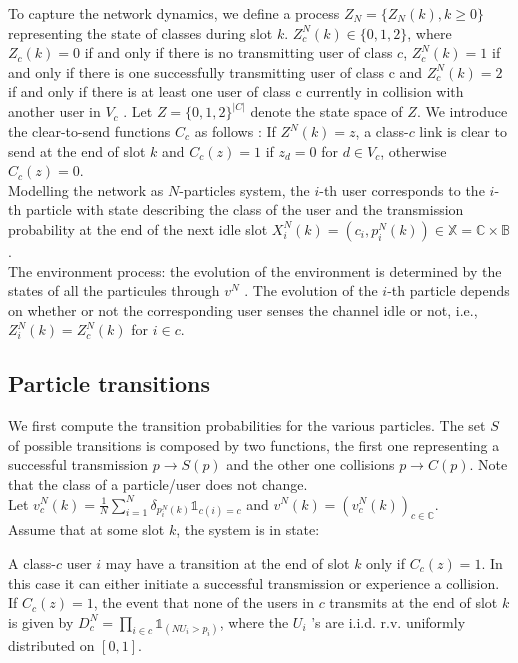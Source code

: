 \documentclass[letterpaper,english,10pt]{article}
\begin{document}
To capture the network dynamics, we define a process $Z_N = \{Z_N (k), k \geq 0\}$ representing the state of classes during slot $k$. $Z_c^N (k) \in \{0, 1, 2\}$, where $Z_ c(k) = 0$ if and only if there is no transmitting user of class $c$, $Z_c^N (k) = 1$ if
and only if there is one successfully transmitting user of class c and $Z_c^N (k) = 2$ if and only if there is at least one user of class c currently in collision with another user in $V_c$ . Let $Z = \{0, 1, 2\}^{|C|}$ denote the state space of $Z$. We introduce the clear-to-send functions $C_c$ as follows : If $Z^N (k) = z$, a class-$c$ link is clear to send at the end of slot $k$ and $C_c (z) = 1$ if $z_d = 0$ for $d \in V_c$, otherwise $C_c (z) = 0$.\\

Modelling the network as $N$-particles system, the $i$-th user corresponds to the $i$-th particle with state describing the class of the user and the transmission probability at the end of the next idle slot $X_i^N (k) = (c_i , p^N_i (k)) \in \mathbb{X} = \mathbb{C} \times \mathbb{B}$.\\

The environment process: the evolution of the environment is determined by the states of all the particules through $v^N$ . The evolution of the $i$-th particle depends on whether or not the corresponding user senses the channel idle or not, i.e., $Z_i^N (k) = Z_c^N (k)$ for $i \in c$.

\subsection{Particle transitions} We first compute the transition probabilities for the various particles. The set $S$ of possible transitions is composed by two functions, the first one representing a successful transmission $p \to S(p)$ and the other one collisions $p \to C(p)$. Note that the class of a particle/user does not change.\\

Let $v_c^N (k) = \frac{1}{N}\sum_{i =1}^{N} \delta_{p_i^N(k)} \mathbb{1}_{c(i)=c}$ and $v^N (k) = (v_c^N (k))_{c\in\mathbb{C}}$.\\

Assume that at some slot $k$, the system is in state: 

A class-$c$ user $i$ may have a transition at the end of slot $k$ only if $C_c (z) = 1$. In this case it can either initiate a successful transmission or experience a collision. If $C_c (z) = 1$, the event that none of the users in $c$ transmits at the end of slot $k$ is given by $D_c^N = \prod_{i \in c}{\mathbb{1}_{(NU_i > p_i)}} $, where the $U_i$ ’s are i.i.d. r.v. uniformly distributed on $[0, 1]$.\\
\end{document}
